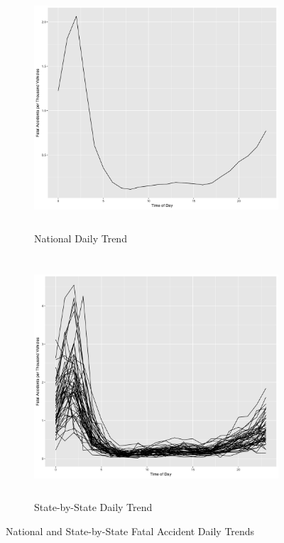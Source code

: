 \documentclass[11pt, oneside,titlepage]{article}   	%
\begin{document}
\begin{figure}[H]
\centering
\begin{subfigure}{.5\textwidth}
	\centering
	\includegraphics[width=.9\textwidth,height=9cm,keepaspectratio]{WeightedNationalDayTrends.png}
	\caption{National Daily Trend}
	\label{fig:sub1}
\end{subfigure}%
\begin{subfigure}{.5\textwidth}
  \centering
	\includegraphics[width=.9\textwidth, height=9cm,keepaspectratio]{WeightedStatePlot.png}
	\caption{State-by-State Daily Trend}
  \label{fig:sub2}
\end{subfigure}
\caption{National and State-by-State Fatal Accident Daily Trends}
\label{fig:test}
\end{figure}
\end{document}
